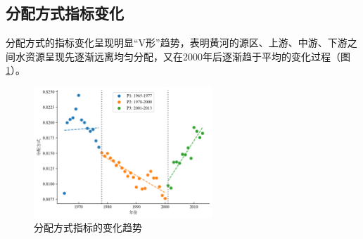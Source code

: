 \subsection{分配方式指标变化}

分配方式的指标变化呈现明显“V形”趋势，表明黄河的源区、上游、中游、下游之间水资源呈现先逐渐远离均匀分配，又在2000年后逐渐趋于平均的变化过程（图\ref{ch4:fig:allocation}）。

\begin{figure}[htb]
	\centering
	\includegraphics[width=0.6\textwidth]{img/ch4/ch4_allocation.png}
	\caption{分配方式指标的变化趋势}\label{ch4:fig:allocation}
\end{figure}